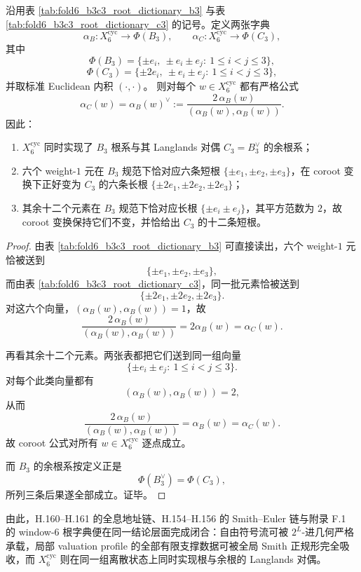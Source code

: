 \begin{theorem}\label{thm:xi-time-part62de-window6-b3c3-coroot-duality}
沿用表 \ref{tab:fold6_b3c3_root_dictionary_b3} 与表 \ref{tab:fold6_b3c3_root_dictionary_c3} 的记号。定义两张字典
\[
\alpha_B:X_6^{\mathrm{cyc}}\to \Phi(B_3),
\qquad
\alpha_C:X_6^{\mathrm{cyc}}\to \Phi(C_3),
\]
其中
\[
\Phi(B_3)=\{\pm e_i,\ \pm e_i\pm e_j:\ 1\le i<j\le 3\},
\]
\[
\Phi(C_3)=\{\pm 2e_i,\ \pm e_i\pm e_j:\ 1\le i<j\le 3\},
\]
并取标准 Euclidean 内积 \((\cdot,\cdot)\)。
则对每个 \(w\in X_6^{\mathrm{cyc}}\) 都有严格公式
\[
\alpha_C(w)
=
\alpha_B(w)^\vee
:=
\frac{2\,\alpha_B(w)}{(\alpha_B(w),\alpha_B(w))}.
\]
因此：
\begin{enumerate}
  \item \(X_6^{\mathrm{cyc}}\) 同时实现了 \(B_3\) 根系与其 Langlands 对偶 \(C_3=B_3^\vee\) 的余根系；
  \item 六个 weight-\(1\) 元在 \(B_3\) 规范下恰对应六条短根 \(\{\pm e_1,\pm e_2,\pm e_3\}\)，在 coroot 变换下正好变为 \(C_3\) 的六条长根 \(\{\pm 2e_1,\pm 2e_2,\pm 2e_3\}\)；
  \item 其余十二个元素在 \(B_3\) 规范下恰对应长根 \(\{\pm e_i\pm e_j\}\)，其平方范数为 \(2\)，故 coroot 变换保持它们不变，并恰给出 \(C_3\) 的十二条短根。
\end{enumerate}
\end{theorem}
\begin{proof}
由表 \ref{tab:fold6_b3c3_root_dictionary_b3} 可直接读出，六个 weight-\(1\) 元恰被送到
\[
\{\pm e_1,\pm e_2,\pm e_3\},
\]
而由表 \ref{tab:fold6_b3c3_root_dictionary_c3}，同一批元素恰被送到
\[
\{\pm 2e_1,\pm 2e_2,\pm 2e_3\}.
\]
对这六个向量，\((\alpha_B(w),\alpha_B(w))=1\)，故
\[
\frac{2\,\alpha_B(w)}{(\alpha_B(w),\alpha_B(w))}=2\alpha_B(w)=\alpha_C(w).
\]

再看其余十二个元素。两张表都把它们送到同一组向量
\[
\{\pm e_i\pm e_j:\ 1\le i<j\le 3\}.
\]
对每个此类向量都有
\[
(\alpha_B(w),\alpha_B(w))=2,
\]
从而
\[
\frac{2\,\alpha_B(w)}{(\alpha_B(w),\alpha_B(w))}
=
\alpha_B(w)
=
\alpha_C(w).
\]
故 coroot 公式对所有 \(w\in X_6^{\mathrm{cyc}}\) 逐点成立。

而 \(B_3\) 的余根系按定义正是
\[
\Phi(B_3^\vee)=\Phi(C_3),
\]
所列三条后果遂全部成立。证毕。
\end{proof}

\noindent
由此，H.160--H.161 的全息地址链、H.154--H.156 的 Smith--Euler 链与附录 F.1 的 window-\(6\) 根字典便在同一结论层面完成闭合：自由符号流可被 \(2^L\)-进几何严格承载，局部 valuation profile 的全部有限支撑数据可被全局 Smith 正规形完全吸收，而 \(X_6^{\mathrm{cyc}}\) 则在同一组离散状态上同时实现根与余根的 Langlands 对偶。

\endinput

